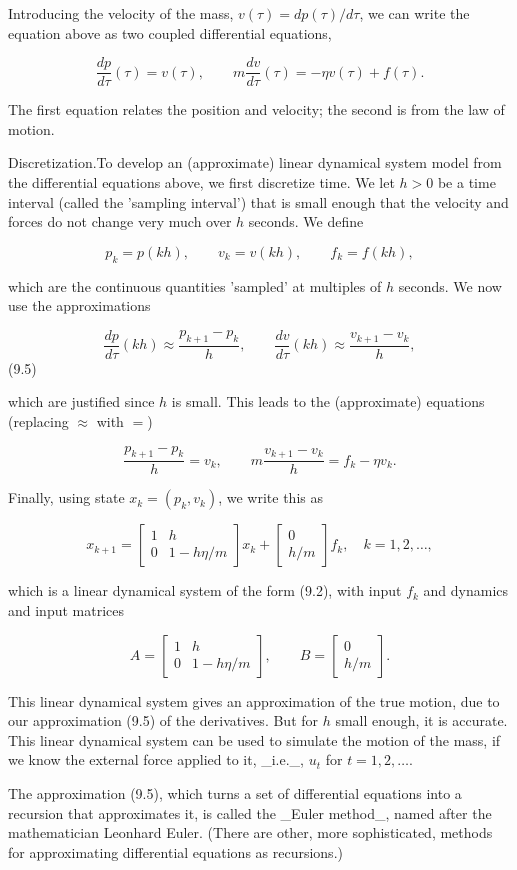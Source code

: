 Introducing the velocity of the mass, \(v(\tau)=dp(\tau)/d\tau\), we can write the equation above as two coupled differential equations,

\[\frac{dp}{d\tau}(\tau)=v(\tau),\qquad m\frac{dv}{d\tau}(\tau)=-\eta v(\tau)+f( \tau).\]

The first equation relates the position and velocity; the second is from the law of motion.

Discretization.To develop an (approximate) linear dynamical system model from the differential equations above, we first discretize time. We let \(h>0\) be a time interval (called the 'sampling interval') that is small enough that the velocity and forces do not change very much over \(h\) seconds. We define

\[p_{k}=p(kh),\qquad v_{k}=v(kh),\qquad f_{k}=f(kh),\]

which are the continuous quantities 'sampled' at multiples of \(h\) seconds. We now use the approximations

\[\frac{dp}{d\tau}(kh)\approx\frac{p_{k+1}-p_{k}}{h},\qquad\frac{dv}{d\tau}(kh) \approx\frac{v_{k+1}-v_{k}}{h},\] (9.5)

which are justified since \(h\) is small. This leads to the (approximate) equations (replacing \(\approx\) with \(=\))

\[\frac{p_{k+1}-p_{k}}{h}=v_{k},\qquad m\frac{v_{k+1}-v_{k}}{h}=f_{k}-\eta v_{k}.\]

Finally, using state \(x_{k}=(p_{k},v_{k})\), we write this as

\[x_{k+1}=\left[\begin{array}{cc}1&h\\ 0&1-h\eta/m\end{array}\right]x_{k}+\left[\begin{array}{c}0\\ h/m\end{array}\right]f_{k},\quad k=1,2,\ldots,\]

which is a linear dynamical system of the form (9.2), with input \(f_{k}\) and dynamics and input matrices

\[A=\left[\begin{array}{cc}1&h\\ 0&1-h\eta/m\end{array}\right],\qquad B=\left[\begin{array}{c}0\\ h/m\end{array}\right].\]

This linear dynamical system gives an approximation of the true motion, due to our approximation (9.5) of the derivatives. But for \(h\) small enough, it is accurate. This linear dynamical system can be used to simulate the motion of the mass, if we know the external force applied to it, _i.e._, \(u_{t}\) for \(t=1,2,\ldots\).

The approximation (9.5), which turns a set of differential equations into a recursion that approximates it, is called the _Euler method_, named after the mathematician Leonhard Euler. (There are other, more sophisticated, methods for approximating differential equations as recursions.) 